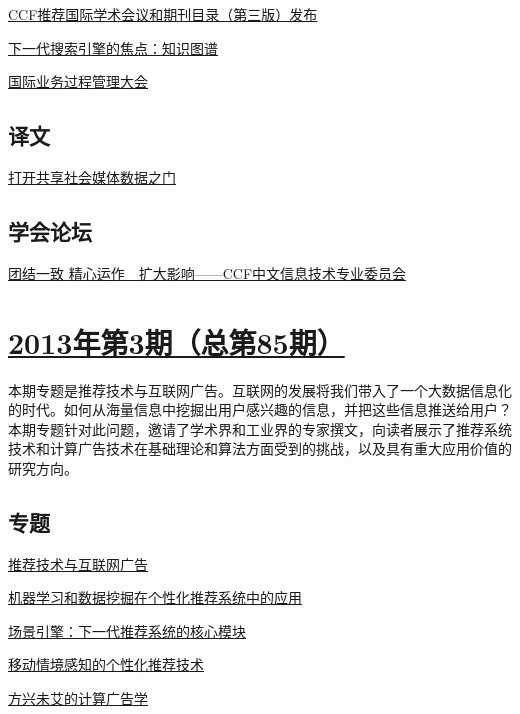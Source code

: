 \documentclass[a4paper]{article}
\begin{document}
\href{http://history.ccf.org.cn/resources/1190201776262/2013/04/18/14.pdf}{CCF推荐国际学术会议和期刊目录（第三版）发布}

\href{http://history.ccf.org.cn/resources/1190201776262/2013/04/18/12.pdf}{下一代搜索引擎的焦点：知识图谱}

\href{http://history.ccf.org.cn/resources/1190201776262/2013/04/18/13.pdf}{国际业务过程管理大会}

\subsection{译文}
\href{http://history.ccf.org.cn/resources/1190201776262/2013/04/18/15.pdf}{打开共享社会媒体数据之门}

\subsection{学会论坛}
\href{http://history.ccf.org.cn/resources/1190201776262/2013/04/18/16.pdf}{团结一致 精心运作　扩大影响——CCF中文信息技术专业委员会}


\section{\href{http://history.ccf.org.cn/sites/ccf/jsjtbbd.jsp?contentId=2726585359042}{\textbf{2013年第3期（总第85期）}}}
本期专题是推荐技术与互联网广告。互联网的发展将我们带入了一个大数据信息化的时代。如何从海量信息中挖掘出用户感兴趣的信息，并把这些信息推送给用户？本期专题针对此问题，邀请了学术界和工业界的专家撰文，向读者展示了推荐系统技术和计算广告技术在基础理论和算法方面受到的挑战，以及具有重大应用价值的研究方向。
\subsection{专题}
\href{http://history.ccf.org.cn/resources/1190201776262/2013/03/15/1.pdf}{推荐技术与互联网广告}

\href{http://history.ccf.org.cn/resources/1190201776262/2013/03/15/2.pdf}{机器学习和数据挖掘在个性化推荐系统中的应用}

\href{http://history.ccf.org.cn/resources/1190201776262/2013/03/15/3.pdf}{场景引擎：下一代推荐系统的核心模块}

\href{http://history.ccf.org.cn/resources/1190201776262/2013/03/15/4.pdf}{移动情境感知的个性化推荐技术}

\href{http://history.ccf.org.cn/resources/1190201776262/2013/03/15/5.pdf}{方兴未艾的计算广告学}
\end{document}

